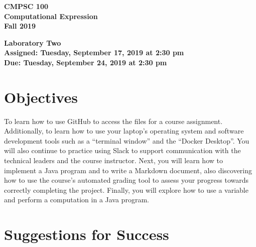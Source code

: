 \documentclass[11pt]{article}
\newcommand{\assignmentduedate}{September 24}
\newcommand{\assignmentassignedate}{September 17}
\newcommand{\assignmentnumber}{Two}
\newcommand{\labyear}{2019}
\newcommand{\labday}{Tuesday}
\newcommand{\labtime}{2:30 pm}
\newcommand{\assigneddate}{Assigned: \labday, \assignmentassignedate, \labyear{} at \labtime{}}
\newcommand{\duedate}{Due: \labday, \assignmentduedate, \labyear{} at \labtime{}}
\newcommand{\labtitle}[1]
{
  \begin{center}
    \begin{center}
      \bf
      CMPSC 100\\Computational Expression\\
      Fall 2019\\
      \medskip
    \end{center}
    \bf
    #1
  \end{center}
}
\begin{document}
\thispagestyle{empty}

\labtitle{Laboratory \assignmentnumber{} \\ \assigneddate{} \\ \duedate{}}

\section*{Objectives}

To learn how to use GitHub to access the files for a course assignment.
Additionally, to learn how to use your laptop's operating system and software
development tools such as a ``terminal window'' and the ``Docker Desktop''. You
will also continue to practice using Slack to support communication with the
technical leaders and the course instructor. Next, you will learn how to
implement a Java program and to write a Markdown document, also discovering how
to use the course's automated grading tool to assess your progress towards
correctly completing the project.
%
Finally, you will explore how to use a variable and perform a computation in a
Java program.

\section*{Suggestions for Success}
\end{document}
